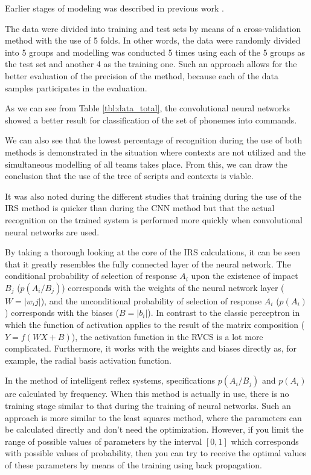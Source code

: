 \documentclass[review,authoryear]{elsarticle}
\begin{document}
Earlier stages of modeling was described in previous work \citep{eng_art5}.

The data were divided into training and test sets by means of a cross-validation method with the use of 5 folds. In other words, the data were randomly divided into 5 groups and modelling was conducted 5 times using each of the 5 groups as the test set and another 4 as the training one. Such an approach allows for the better evaluation of the precision of the method, because each of the data samples participates in the evaluation.

As we can see from Table \ref{tbl:data_total}, the convolutional neural networks showed a better result for classification of the set of phonemes into commands. 

We can also see that the lowest percentage of recognition during the use of both methods is demonstrated in the situation where contexts are not utilized and the simultaneous modelling of all teams takes place. From this, we can draw the conclusion that the use of the tree of scripts and contexts is viable. 

It was also noted during the different studies that training during the use of the IRS method is quicker than during the CNN method but that the actual recognition on the trained system is performed more quickly when convolutional neural networks are used. 

By taking a thorough looking at the core of the IRS calculations, it can be seen that it greatly resembles the fully connected layer of the neural network. The conditional probability of selection of response $A_i$ upon the existence of impact $B_j$ ($p(A_i/B_j)$) corresponds with the weights of the neural network layer ($W = |w_ij|$), and the unconditional probability of selection of response $A_i$ ($p(A_i)$) corresponds with the biases ($B = |b_i|$). In contrast to the classic perceptron in which the function of activation applies to the result of the matrix composition ($Y=f(WX + B)$), the activation function in the RVCS is a lot more complicated. Furthermore, it works with the weights and biases directly as, for example, the radial basis activation function. 

In the method of intelligent reflex systems, specifications $p(A_i/B_j)$ and $p(A_i)$ are calculated by frequency. When this method is actually in use, there is no training stage similar to that during the training of neural networks. Such an approach is more similar to the least squares method, where the parameters can be calculated directly and don’t need the optimization. 
However, if you limit the range of possible values of parameters by the interval $[0, 1]$ which corresponds with possible values of probability, then you can try to receive the optimal values of these parameters by means of the training using back propagation. 
\end{document}
